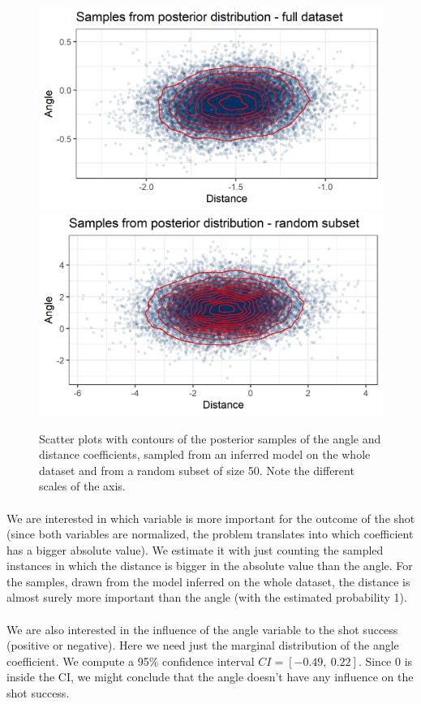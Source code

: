 \documentclass[twocolumn]{article}
\begin{document}
\begin{figure}[ht]
    \centering
    \includegraphics[width=.49\textwidth]{full.png}
    \includegraphics[width=.49\textwidth]{subset.png}
    \caption{Scatter plots with contours of the posterior samples of the angle and distance coefficients, sampled from an inferred model on the whole dataset and from a random subset of size 50. Note the different scales of the axis.}
    \label{fig:scatter}
\end{figure}

\paragraph{} We are interested in which variable is more important for the outcome of the shot (since both variables are normalized, the problem translates into which coefficient has a bigger absolute value). We estimate it with just counting the sampled instances in which the distance is bigger in the absolute value than the angle. For the samples, drawn from the model inferred on the whole dataset, the distance is almost surely more important than the angle (with the estimated probability 1).

\paragraph{} We are also interested in the influence of the angle variable to the shot success (positive or negative). Here we need just the marginal distribution of the angle coefficient. We compute a 95\% confidence interval $CI = [-0.49,\ 0.22]$. Since 0 is inside the CI, we might conclude that the angle doesn't have any influence on the shot success.
\end{document}
